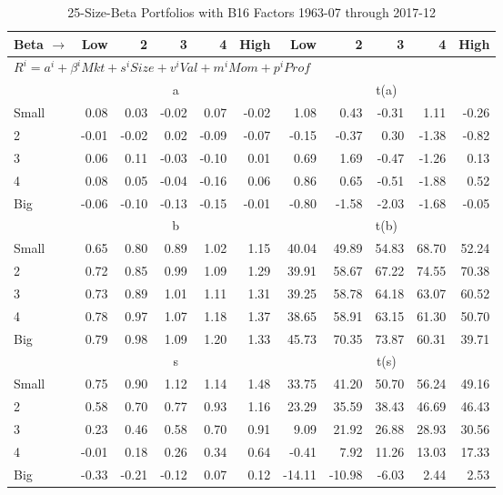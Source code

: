 
\begin{table}[!ht]
\footnotesize
\centering
\caption{25-Size-Beta Portfolios with B16 Factors 1963-07 through 2017-12}
\begin{tabular}{lrrrrrrrrrr}
  \toprule
    
    Beta $\rightarrow$ & Low & 2 & 3 & 4 & High & Low & 2 & 3 & 4 & High  \\ 
  \midrule
  \multicolumn{11}{l}{$R^i=a^i+\beta^iMkt+s^iSize+v^iVal+m^iMom+p^iProf$}  \\
  
     & \multicolumn{5}{c}{a} & \multicolumn{5}{c}{t(a)}   \\
     \cmidrule(r){2-6} \cmidrule(r){7-11} 
    Small  & 0.08  & 0.03  & -0.02  & 0.07  & -0.02  & 1.08  & 0.43  & -0.31  & 1.11  & -0.26   \\
    2  & -0.01  & -0.02  & 0.02  & -0.09  & -0.07  & -0.15  & -0.37  & 0.30  & -1.38  & -0.82   \\
    3  & 0.06  & 0.11  & -0.03  & -0.10  & 0.01  & 0.69  & 1.69  & -0.47  & -1.26  & 0.13   \\
    4  & 0.08  & 0.05  & -0.04  & -0.16  & 0.06  & 0.86  & 0.65  & -0.51  & -1.88  & 0.52   \\
    Big  & -0.06  & -0.10  & -0.13  & -0.15  & -0.01  & -0.80  & -1.58  & -2.03  & -1.68  & -0.05   \\
    
  
     & \multicolumn{5}{c}{b} & \multicolumn{5}{c}{t(b)}   \\
     \cmidrule(r){2-6} \cmidrule(r){7-11} 
    Small  & 0.65  & 0.80  & 0.89  & 1.02  & 1.15  & 40.04  & 49.89  & 54.83  & 68.70  & 52.24   \\
    2  & 0.72  & 0.85  & 0.99  & 1.09  & 1.29  & 39.91  & 58.67  & 67.22  & 74.55  & 70.38   \\
    3  & 0.73  & 0.89  & 1.01  & 1.11  & 1.31  & 39.25  & 58.78  & 64.18  & 63.07  & 60.52   \\
    4  & 0.78  & 0.97  & 1.07  & 1.18  & 1.37  & 38.65  & 58.91  & 63.15  & 61.30  & 50.70   \\
    Big  & 0.79  & 0.98  & 1.09  & 1.20  & 1.33  & 45.73  & 70.35  & 73.87  & 60.31  & 39.71   \\
    
  
     & \multicolumn{5}{c}{s} & \multicolumn{5}{c}{t(s)}   \\
     \cmidrule(r){2-6} \cmidrule(r){7-11} 
    Small  & 0.75  & 0.90  & 1.12  & 1.14  & 1.48  & 33.75  & 41.20  & 50.70  & 56.24  & 49.16   \\
    2  & 0.58  & 0.70  & 0.77  & 0.93  & 1.16  & 23.29  & 35.59  & 38.43  & 46.69  & 46.43   \\
    3  & 0.23  & 0.46  & 0.58  & 0.70  & 0.91  & 9.09  & 21.92  & 26.88  & 28.93  & 30.56   \\
    4  & -0.01  & 0.18  & 0.26  & 0.34  & 0.64  & -0.41  & 7.92  & 11.26  & 13.03  & 17.33   \\
    Big  & -0.33  & -0.21  & -0.12  & 0.07  & 0.12  & -14.11  & -10.98  & -6.03  & 2.44  & 2.53   \\
    

\end{tabular}
\end{table}
